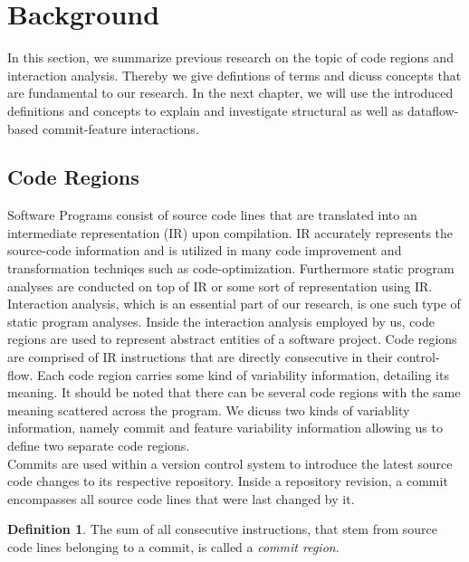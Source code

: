 \section*{Background}\label{ch:background}

In this section, we summarize previous research on the topic of code regions and interaction analysis.
Thereby we give defintions of terms and dicuss concepts that are fundamental to our research.
In the next chapter, we will use the introduced definitions and concepts to explain and investigate structural as well as dataflow-based commit-feature interactions.

\subsection*{Code Regions}
Software Programs consist of source code lines that are translated into an intermediate representation (IR) upon compilation.
IR accurately represents the source-code information and is utilized in many code improvement and transformation techniqes such as code-optimization.
Furthermore static program analyses are conducted on top of IR or some sort of representation using IR. 
Interaction analysis, which is an essential part of our research, is one such type of static program analyses.
Inside the interaction analysis employed by us, code regions are used to represent abstract entities of a software project. 
Code regions are comprised of IR instructions that are directly consecutive in their control-flow. 
Each code region carries some kind of variability information, detailing its meaning.
It should be noted that there can be several code regions with the same meaning scattered across the program.
We dicuss two kinds of variablity information, namely commit and feature variability information allowing us to define two separate code regions. \\
Commits are used within a version control system to introduce the latest source code changes to its respective repository.
Inside a repository revision, a commit encompasses all source code lines that were last changed by it. 

\theoremstyle{definition}
\newtheorem{definition}{Definition}
\begin{definition}
	The sum of all consecutive instructions, that stem from source code lines belonging to a commit, is called a \emph{commit region}.
\end{definition}

